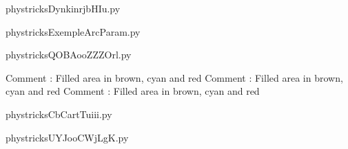    \newcommand{\CaptionFigDynkinrjbHIu}{<+Type your caption here+>}
    \begin{center}
        
    \end{center}
    phystricksDynkinrjbHIu.py

    

    \clearpage
    


    \newcommand{\CaptionFigExempleArcParam}{<+Type your caption here+>}
    \begin{center}
        
    \end{center}
    phystricksExempleArcParam.py

    

    \clearpage
    


    \newcommand{\CaptionFigQOBAooZZZOrl}{<+Type your caption here+>}
    \begin{center}
        
    \end{center}
    phystricksQOBAooZZZOrl.py

    Comment : Filled area in brown, cyan and red
Comment : Filled area in brown, cyan and red
Comment : Filled area in brown, cyan and red

    \clearpage
    


    \newcommand{\CaptionFigCbCartTuiii}{<+Type your caption here+>}
    \begin{center}
        
    \end{center}
    phystricksCbCartTuiii.py

    

    \clearpage
    


    \newcommand{\CaptionFigUYJooCWjLgK}{<+Type your caption here+>}
    \begin{center}
        
    \end{center}
    phystricksUYJooCWjLgK.py

    

    \clearpage
    


